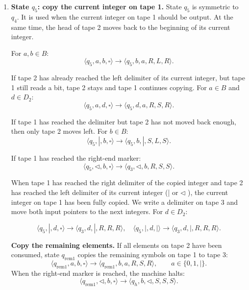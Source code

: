 \documentclass[12pt,a4paper]{article}
\makeatletter
\newtheorem*{solution}{Solution}
\theoremstyle{definition}
\renewenvironment{solution}[1][Solution] {\par\pushQED{\qed}\normalfont\topsep6\p@\@plus6\p@\relax\trivlist\item[\hskip\labelsep\bfseries#1\@addpunct{.}]\ignorespaces}{\popQED\endtrivlist\@endpefalse} \makeatother
\makeatother
\begin{document}
\begin{enumerate}
\begin{solution}
\begin{enumerate}
            \medskip
            \noindent\textbf{State \(q_5\): copy the current integer on tape 1.} 
            State \(q_5\) is symmetric to \(q_4\). It is used when the current integer on tape 1 should be output. At the same time, the head of tape 2 moves back to the beginning of its current integer. 
            
            For \(a,b\in B\):
            \[
            \langle q_5,a,b,\square\rangle \to \langle q_5,b,a,R,L,R\rangle .
            \]
            
            If tape 2 has already reached the left delimiter of its current integer, but tape 1 still reads a bit, tape 2 stays and tape 1 continues copying. For \(a\in B\) and \(d\in D_2\):
            \[
            \langle q_5,a,d,\square\rangle \to \langle q_5,d,a,R,S,R\rangle .
            \]
            
            If tape 1 has reached the delimiter but tape 2 has not moved back enough, then only tape 2 moves left. For \(b\in B\):
            \[
            \langle q_5,|,b,\square\rangle \to \langle q_5,b,|,S,L,S\rangle .
            \]
            
            If tape 1 has reached the right-end marker:
            \[
            \langle q_5,\triangleleft,b,\square\rangle \to \langle q_3,\triangleleft,b,R,S,S\rangle .
            \]
            
            When tape 1 has reached the right delimiter of the copied integer and tape 2 has reached the left delimiter of its current integer (| or $\triangleleft$ ), the current integer on tape 1 has been fully copied. We write a delimiter on tape 3 and move both input pointers to the next integers. For \(d\in D_2\):
            
            \[
            \langle q_5,|,d,\square\rangle \to \langle q_3,d,|,R,R,R\rangle ,\quad
            \langle q_5,|,d,|\rangle \to \langle q_3,d,|,R,R,R\rangle .
            \]
            
            
            \medskip \noindent\textbf{Copy the remaining elements.} If all elements on tape 2 have been consumed, state \(q_{\mathrm{rem1}}\) copies the remaining symbols on tape 1 to tape 3: \[ \langle q_{\mathrm{rem1}},a,b,\square\rangle \to \langle q_{\mathrm{rem1}},b,a,R,S,R\rangle , \qquad a\in\{0,1,\vert\}. \] When the right-end marker is reached, the machine halts: \[ \langle q_{\mathrm{rem1}},\triangleleft,b,\square\rangle \to \langle q_h,b,\triangleleft,S,S,S\rangle . \] 
            

\end{enumerate}
\end{solution}
\end{enumerate}
\end{document}
